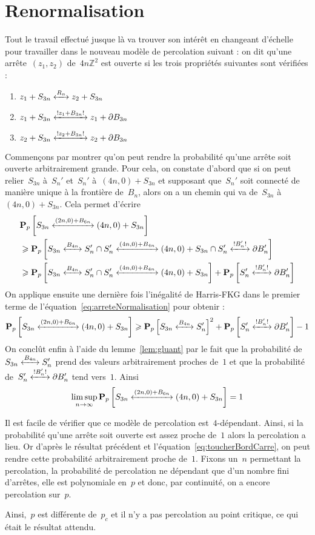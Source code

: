 \section{Renormalisation}

	Tout le travail effectué jusque là va trouver son intérêt en changeant d'échelle pour travailler dans le nouveau modèle de percolation suivant : on dit qu'une arrête~$(z_1, z_2)$ de~$4n\mathbb{Z}^2$ est ouverte si les trois propriétés suivantes sont vérifiées :
	\begin{enumerate}[label=(\roman*)]
		\item $\relie[R_n]{z_1 + S_{3n}}{z_2 + S_{3n}}$
		\item $\relie*[z_1 + B_{3n}]{z_1 + S_{3n}}{z_1 + \partial B_{3n}}$
		\item $\relie*[z_2 + B_{3n}]{z_2 + S_{3n}}{z_2 + \partial B_{3n}}$ 
	\end{enumerate}
	Commençons par montrer qu'on peut rendre la probabilité qu'une arrête soit ouverte arbitrairement grande. Pour cela, on constate d'abord que si on peut relier~$S_{3n}$ à~$S_n'$ et~$S_n'$ à~$(4n, 0) + S_{3n}$ et supposant que~$S_n'$ soit connecté de manière unique à la frontière de~$B_n$, alors on a un chemin qui va de~$S_{3n}$ à~$(4n, 0) + S_{3n}$. Cela permet d'écrire
	\begin{align}
		& \Pp{\relie[(2n, 0) + B_{6n}]{S_{3n}}{(4n, 0) + S_{3n}}} \nonumber \\
		& \geq \Pp{ \relie[B_{4n}]{S_{3n}}{S_n'} \cap \relie[(4n, 0) + B_{4n}]{S_n'}{(4n, 0) + S_{3n}} \cap \relie*[B_n']{S_n'}{\partial B_n'} } \nonumber \\
		& \geq \Pp{ \relie[B_{4n}]{S_{3n}}{S_n'} \cap \relie[(4n, 0) + B_{4n}]{S_n'}{(4n, 0) + S_{3n}}} + \Pp{\relie*[B_n']{S_n'}{\partial B_n'}} \label{eq:arreteNormalisation}\\ 
	\end{align}
	On applique ensuite une dernière fois l'inégalité de Harris-FKG dans le premier terme de l'équation~\ref{eq:arreteNormalisation} pour obtenir :
	\[
		\Pp{\relie[(2n, 0) + B_{6n}]{S_{3n}}{(4n, 0) + S_{3n}}}	\geq \Pp{ \relie[B_{4n}]{S_{3n}}{S_n'} }^2 + \Pp{\relie*[B_n']{S_n'}{\partial B_n'}}  - 1
	\]
	On conclût enfin à l'aide du lemme~\ref{lem:gluant} par le fait que la probabilité de~$\relie[B_{4n}]{S_{3n}}{S_n'}$ prend des valeurs arbitrairement proches de~$1$ et que la probabilité de~$\relie*[B_n']{S_n'}{\partial B_n'}$ tend vers~$1$. Ainsi
	\[
		\limsup_{n \to \infty} \Pp{\relie[(2n, 0) + B_{6n}]{S_{3n}}{(4n, 0) + S_{3n}}} = 1
	\]

	Il est facile de vérifier que ce modèle de percolation est~$4$-dépendant. Ainsi, si la probabilité qu'une arrête soit ouverte est assez proche de~$1$ alors la percolation a lieu. Or d'après le résultat précédent et l'équation~\ref{eq:toucherBordCarre}, on peut rendre cette probabilité arbitrairement proche de~$1$. Fixons un~$n$ permettant la percolation, la probabilité de percolation ne dépendant que d'un nombre fini d'arrêtes, elle est polynomiale en~$p$ et donc, par continuité, on a encore percolation sur~$p$.

	Ainsi,~$p$ est différente de~$p_c$ et il n'y a pas percolation au point critique, ce qui était le résultat attendu.
